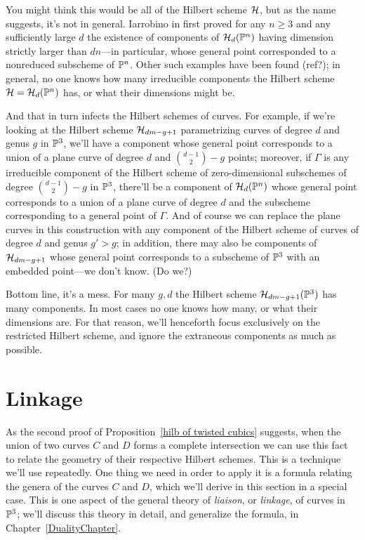You might think this would be all of the Hilbert scheme $\cH$, but as the name suggests, it's not in general. Iarrobino in \cite{Iarrobino} first proved  for any $n \geq 3$ and any sufficiently large $d$ the existence of components of $\cH_d(\PP^n)$ having dimension strictly larger than $dn$---in particular, whose general point corresponded to a nonreduced subscheme of $\PP^n$. Other such examples have been found (ref?); in general, no one knows how many irreducible components the Hilbert scheme $\cH = \cH_d(\PP^n)$ has, or what their dimensions might be.

And that in turn infects the Hilbert schemes of curves. For example, if we're looking at the Hilbert scheme $\cH_{dm-g+1}$ parametrizing curves of degree $d$ and genus $g$ in $\PP^3$, we'll have a component whose general point corresponds to a union of a plane curve of degree $d$ and $\binom{d-1}{2} - g$ points; moreover, if $\Gamma$ is any irreducible component of the Hilbert scheme of zero-dimensional subschemes of degree $\binom{d-1}{2} - g$ in $\PP^3$, there'll be a component of $\cH_d(\PP^n)$ whose  general point corresponds to a union of a plane curve of degree $d$ and the subscheme corresponding to a general point of $\Gamma$. And of course we can replace the plane curves in this construction with any component of the Hilbert scheme of curves of degree $d$ and genus $g' > g$; in addition, there may also be components of $\cH_{dm-g+1}$ whose general point corresponds to a subscheme of $\PP^3$ with an embedded point---we don't know. (Do we?)

Bottom line, it's a mess. For many $g,d$ the Hilbert scheme $\cH_{dm-g+1}(\PP^3)$ has many components. In most cases no one knows how many, or what their dimensions are.
For that reason, we'll henceforth focus exclusively on the restricted Hilbert scheme, and ignore the extraneous components as much as possible.

\section{Linkage} \label{SLinkage}

As the second proof of Proposition~\ref{hilb of twisted cubics} suggests, when the union of two curves $C$ and $D$ forms a complete intersection we can use this fact to relate the geometry of their respective Hilbert schemes. This is a technique we'll use repeatedly. One thing we need in order to apply it is a formula relating the genera of the curves $C$ and $D$, which we'll derive in this section in a special case. This is one aspect of the general theory of \emph{liaison}, or \emph{linkage}, of curves in $\PP^3$; we'll discuss this theory in detail, and generalize the formula, in Chapter~\ref{DualityChapter}.

